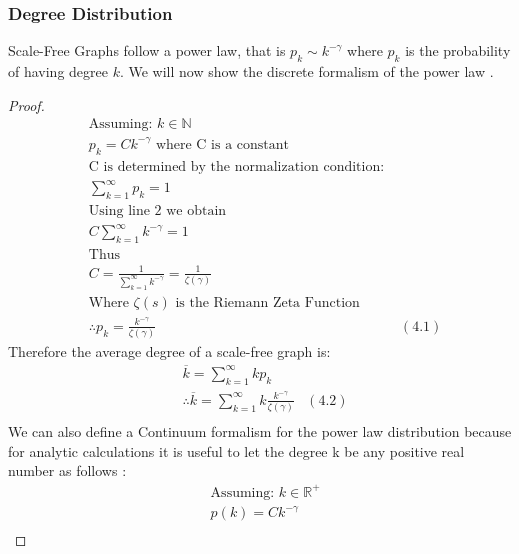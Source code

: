 \documentclass{article}
\begin{document}
            \subsubsection{Degree Distribution}
            Scale-Free Graphs follow a power law, that is $p_{k} \sim k^{-\gamma}$ where $p_{k}$ is the probability of having degree $k$. We will now show the discrete formalism of the power law \parencite{barabasi2013network}.
            \begin{proof}
                \begin{align*}
                    &\text{Assuming: } k\in \mathbb{N}\\
                    &p_{k} = Ck^{-\gamma} \text{ where C is a constant}\\
                    &\text{C is determined by the normalization condition: }\\
                    &\sum_{k = 1}^{\infty}p_{k} = 1\\
                    &\text{Using line 2 we obtain}\\
                    &C\sum_{k=1}^{\infty}k^{-\gamma} = 1\\
                    &\text{Thus}\\
                    &C = \frac{1}{\sum_{k=1}^{\infty}k^{-\gamma}} = \frac{1}{\zeta(\gamma)}\\
                    &\text{Where $\zeta(s)$ is the Riemann Zeta Function}\\
                    &\therefore p_{k}=\frac{k^{-\gamma}}{\zeta(\gamma)} &(4.1)
                \end{align*}
                Therefore the average degree of a scale-free graph is:
                \begin{align*}
                    &\overline{k} = \sum_{k=1}^{\infty}kp_{k}\\
                    &\therefore \overline{k} = \sum_{k=1}^{\infty}k\frac{k^{-\gamma}}{\zeta(\gamma)} &(4.2)\\
                \end{align*}
                We can also define a Continuum formalism for the power law distribution because for analytic calculations it is useful to let the degree k be any positive real number as follows \parencite{barabasi2013network}:
                \begin{align*}
                    &\text{Assuming: } k\in \mathbb{R}^{+}\\
                    &p(k) = Ck^{-\gamma}\\

\end{align*}
\end{proof}
\end{document}
